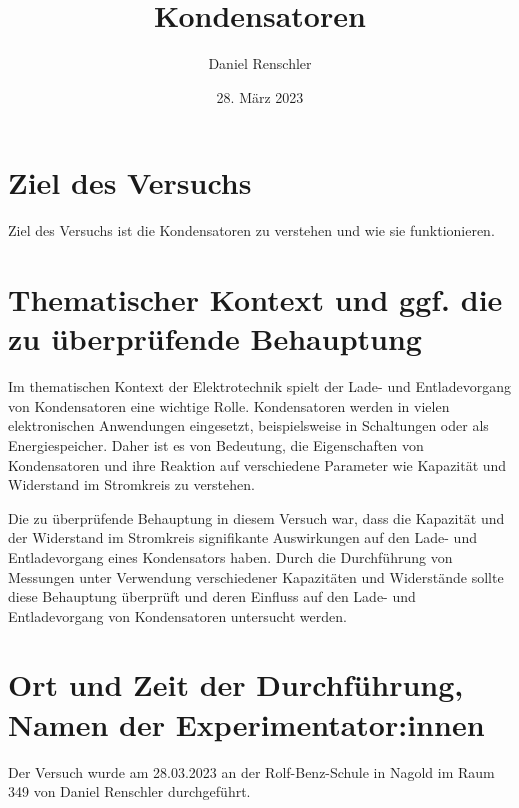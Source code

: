 \documentclass{article}
\title{Kondensatoren}
\author{Daniel Renschler}
\date{28. M\"arz 2023}
\begin{document}
\maketitle




\begin{multicols}{2}
\section{Ziel des Versuchs}
Ziel des Versuchs ist die Kondensatoren zu verstehen und wie sie funktionieren.


\section{Thematischer Kontext und ggf. die zu überprüfende Behauptung}
Im thematischen Kontext der Elektrotechnik spielt der Lade- und Entladevorgang
von Kondensatoren eine wichtige Rolle. Kondensatoren werden in vielen
elektronischen Anwendungen eingesetzt, beispielsweise in Schaltungen oder als
Energiespeicher. Daher ist es von Bedeutung, die Eigenschaften von
Kondensatoren und ihre Reaktion auf verschiedene Parameter wie Kapazität und
Widerstand im Stromkreis zu verstehen.

Die zu überprüfende Behauptung in diesem Versuch war, dass die Kapazität und
der Widerstand im Stromkreis signifikante Auswirkungen auf den Lade- und
Entladevorgang eines Kondensators haben. Durch die Durchführung von Messungen
unter Verwendung verschiedener Kapazitäten und Widerstände sollte diese
Behauptung überprüft und deren Einfluss auf den Lade- und Entladevorgang von
Kondensatoren untersucht werden.

\section{Ort und Zeit der Durchführung, Namen der Experimentator:innen}
Der Versuch wurde am 28.03.2023 an der Rolf-Benz-Schule in Nagold im Raum 349
von Daniel Renschler durchgeführt. 


\end{multicols}
\end{document}
